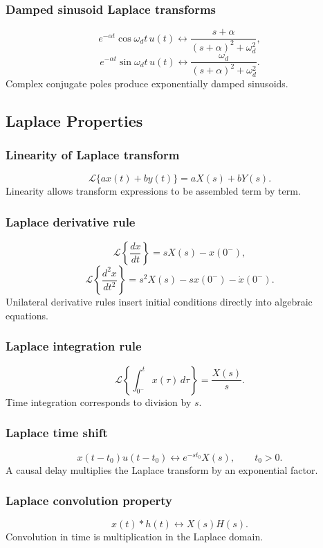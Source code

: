 \subsubsection{Damped sinusoid Laplace transforms}
\[
e^{-\alpha t}\cos\omega_dt\,u(t)\leftrightarrow
\frac{s+\alpha}{(s+\alpha)^2+\omega_d^2},
\]
\[
e^{-\alpha t}\sin\omega_dt\,u(t)\leftrightarrow
\frac{\omega_d}{(s+\alpha)^2+\omega_d^2}.
\]
Complex conjugate poles produce exponentially damped sinusoids.

\subsection{Laplace Properties}

\subsubsection{Linearity of Laplace transform}
\[
\mathcal{L}\{a x(t)+b y(t)\}=aX(s)+bY(s).
\]
Linearity allows transform expressions to be assembled term by term.

\subsubsection{Laplace derivative rule}
\[
\mathcal{L}\left\{\frac{d x}{dt}\right\}=sX(s)-x(0^-),
\]
\[
\mathcal{L}\left\{\frac{d^2 x}{dt^2}\right\}=s^2X(s)-s x(0^-)-\dot{x}(0^-).
\]
Unilateral derivative rules insert initial conditions directly into algebraic equations.

\subsubsection{Laplace integration rule}
\[
\mathcal{L}\left\{\int_{0^-}^{t}x(\tau)\,d\tau\right\}=\frac{X(s)}{s}.
\]
Time integration corresponds to division by \(s\).

\subsubsection{Laplace time shift}
\[
x(t-t_0)u(t-t_0)\leftrightarrow e^{-s t_0}X(s),\qquad t_0>0.
\]
A causal delay multiplies the Laplace transform by an exponential factor.

\subsubsection{Laplace convolution property}
\[
x(t)*h(t)\leftrightarrow X(s)H(s).
\]
Convolution in time is multiplication in the Laplace domain.

